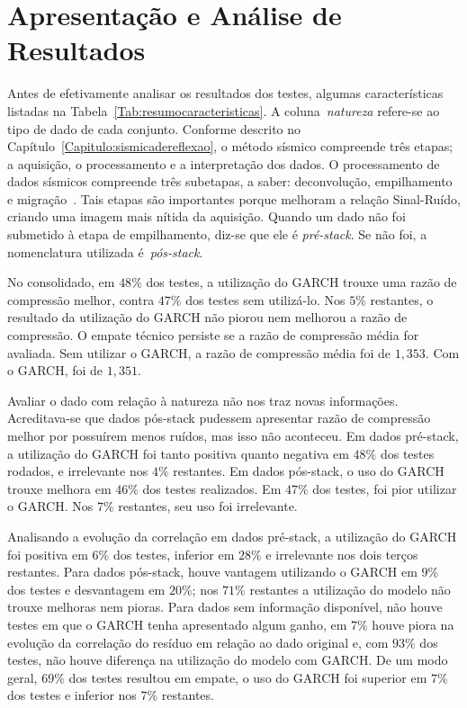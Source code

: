 \section{Apresentação e Análise de Resultados}
\label{Section:analisederesultados}

Antes de efetivamente analisar os resultados dos testes, algumas características
listadas na Tabela~\ref{Tab:resumocaracteristicas}. A coluna~\emph{natureza}
refere-se ao tipo de dado de cada conjunto. Conforme descrito no
Capítulo~\ref{Capitulo:sismicadereflexao}, o método sísmico compreende três
etapas; a aquisição, o processamento e a interpretação dos dados. O
processamento de dados sísmicos compreende três subetapas, a saber:
deconvolução, empilhamento e migração~\citep{Artigo:Stack}. Tais etapas são
importantes porque melhoram a relação Sinal-Ruído, criando uma imagem mais
nítida da aquisição. Quando um dado não foi submetido à etapa de empilhamento,
diz-se que ele é \emph{pré-stack}. Se não foi, a nomenclatura utilizada é~\emph{pós-stack}.


No consolidado, em $48\%$ dos testes, a utilização do GARCH trouxe uma razão de
compressão melhor, contra $47\%$ dos testes sem utilizá-lo. Nos $5\%$ restantes,
o resultado da utilização do GARCH não piorou nem melhorou a razão de
compressão. O empate técnico persiste se a razão de compressão média for
avaliada. Sem utilizar o GARCH, a razão de compressão média foi de $1,353$. Com
o GARCH, foi de $1,351$.

Avaliar o dado com relação à natureza não nos traz novas informações.
Acreditava-se que dados pós-stack pudessem apresentar razão de compressão melhor
por possuírem menos ruídos, mas isso não aconteceu. Em dados pré-stack, a
utilização do GARCH foi tanto positiva quanto negativa em $48\%$ dos testes
rodados, e irrelevante nos $4\%$ restantes. Em dados pós-stack, o uso do GARCH
trouxe melhora em $46\%$ dos testes realizados. Em $47\%$ dos testes, foi pior
utilizar o GARCH. Nos $7\%$ restantes, seu uso foi irrelevante.

Analisando a evolução da correlação em dados pré-stack, a utilização
do GARCH foi positiva em $6\%$ dos testes, inferior em $28\%$ e irrelevante nos
dois terços restantes. Para dados pós-stack, houve vantagem utilizando o GARCH
em $9\%$ dos testes e desvantagem em $20\%$; nos $71\%$ restantes a utilização
do modelo não trouxe melhoras nem pioras. Para dados sem informação disponível,
não houve testes em que o GARCH tenha apresentado algum ganho, em $7\%$ houve piora na
evolução da correlação do resíduo em relação ao dado original e, com $93\%$ dos
testes, não houve diferença na utilização do modelo com GARCH. De um modo geral,
$69\%$ dos testes resultou em empate, o uso do GARCH foi superior em $7\%$ dos
testes e inferior nos $7\%$ restantes.

